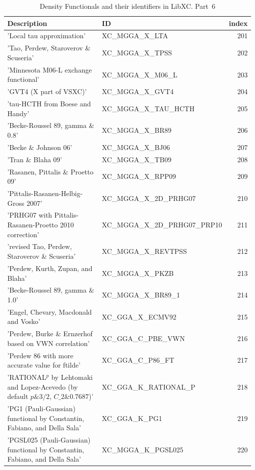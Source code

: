 \documentclass[final,12pt,makeidx,DIV=calc]{article}
\begin{document}
{{{\begin{table}[!h]
\caption{Density Functionals and their identifiers in LibXC. Part~6}
\begin{center}
\begin{tabular}{llr}
\hline
\hline
Description & ID & index\\
\hline
  'Local tau approximation' & XC\_MGGA\_X\_LTA  &201\\
  'Tao, Perdew, Staroverov \& Scuseria' & XC\_MGGA\_X\_TPSS  &202\\
  'Minnesota M06-L exchange functional' & XC\_MGGA\_X\_M06\_L  &203\\
  'GVT4 (X part of VSXC)' & XC\_MGGA\_X\_GVT4  &204\\
  'tau-HCTH from Boese and Handy' & XC\_MGGA\_X\_TAU\_HCTH  &205\\
  'Becke-Roussel 89, gamma \& 0.8' & XC\_MGGA\_X\_BR89  &206\\
  'Becke \& Johnson 06' & XC\_MGGA\_X\_BJ06  &207\\
  'Tran \& Blaha 09' & XC\_MGGA\_X\_TB09  &208\\
  'Rasanen, Pittalis \& Proetto 09' & XC\_MGGA\_X\_RPP09  &209\\
  'Pittalis-Rasanen-Helbig-Gross 2007' & XC\_MGGA\_X\_2D\_PRHG07  &210\\
  'PRHG07 with Pittalis-Rasanen-Proetto 2010 correction' & XC\_MGGA\_X\_2D\_PRHG07\_PRP10  &211\\
  'revised Tao, Perdew, Staroverov \& Scuseria' & XC\_MGGA\_X\_REVTPSS  &212\\
  'Perdew, Kurth, Zupan, and Blaha' & XC\_MGGA\_X\_PKZB  &213\\
  'Becke-Roussel 89, gamma \& 1.0' & XC\_MGGA\_X\_BR89\_1  &214\\
  'Engel, Chevary, Macdonald and Vosko' & XC\_GGA\_X\_ECMV92  &215\\
  'Perdew, Burke \& Ernzerhof based on VWN correlation' & XC\_GGA\_C\_PBE\_VWN  &216\\
  'Perdew 86 with more accurate value for ftilde' & XC\_GGA\_C\_P86\_FT  &217\\
  'RATIONAL$^{p}$ by Lehtomaki and Lopez-Acevedo (by default $p\&3/2$, $C\_{2}\&0.7687$)' & XC\_GGA\_K\_RATIONAL\_P  &218\\
  'PG1 (Pauli-Gaussian) functional by Constantin, Fabiano, and Della Sala' & XC\_GGA\_K\_PG1  &219\\
  'PGSL025 (Pauli-Gaussian) functional by Constantin, Fabiano, and Della Sala' & XC\_MGGA\_K\_PGSL025  &220\\

\end{tabular}
\end{center}
\end{table}}}}
\end{document}
